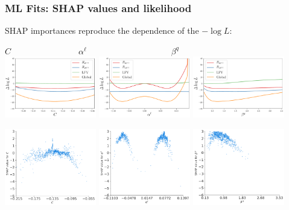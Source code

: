 \documentclass[mathserif, 10pt, dvipsnames]{beamer}
\begin{document}
\begin{frame}\frametitle{ML Fits: SHAP values and likelihood}
    SHAP importances reproduce the dependence of the $-\log L$:
    \begin{center}
{\small \qquad\qquad$C\qquad\qquad\qquad\qquad \alpha^\ell \qquad\qquad\qquad\qquad\qquad\beta^q\qquad$} \\
\includegraphics[width=0.30\textwidth]{figures/evoplot_C.pdf}
\includegraphics[width=0.30\textwidth]{figures/evoplot_alphal.pdf}
\includegraphics[width=0.30\textwidth]{figures/evoplot_betaq.pdf}
    \end{center}
    \begin{center}
\includegraphics[width=0.30\textwidth]{figures/SHAP_C.pdf}
\includegraphics[width=0.30\textwidth]{figures/SHAP_al.pdf}
\includegraphics[width=0.30\textwidth]{figures/SHAP_bq.pdf}

\end{center}
\end{frame}
\end{document}
